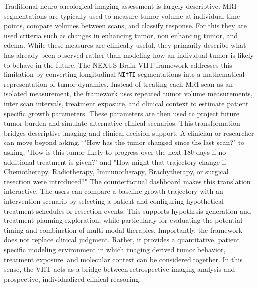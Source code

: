 Traditional neuro oncological imaging assessment is largely descriptive. MRI segmentations are typically used to measure tumor volume at individual time points, compare volumes between scans, and classify response. For this they are used criteria such as changes in enhancing tumor, non enhancing tumor, and edema. While these measures are clinically useful, they primarily describe what has already been observed rather than modeling how an individual tumor is likely to behave in the future. The NEXUS Brain VHT framework addresses this limitation by converting longitudinal \texttt{NIfTI} segmentations into a mathematical representation of tumor dynamics. Instead of treating each MRI scan as an isolated measurement, the framework uses repeated tumor volume measurements, inter scan intervals, treatment exposure, and clinical context to estimate patient specific growth parameters. These parameters are then used to project future tumor burden and simulate alternative clinical scenarios. This transformation bridges descriptive imaging and clinical decision support. A clinician or researcher can move beyond asking, `"How has the tumor changed since the last scan?" to asking, "How is this tumor likely to progress over the next 180 days if no additional treatment is given?" and "How might that trajectory change if Chemotherapy, Radiotherapy, Immunotherapy, Brachytherapy, or surgical resection were introduced?" The counterfactual dashboard makes this translation interactive. The users can compare a baseline growth trajectory with an intervention scenario by selecting a patient and configuring hypothetical treatment schedules or resection events. This supports hypothesis generation and treatment planning exploration, while particularly for evaluating the potential timing and combination of multi modal therapies. Importantly, the framework does not replace clinical judgment. Rather, it provides a quantitative, patient specific modeling environment in which imaging derived tumor behavior, treatment exposure, and molecular context can be considered together. In this sense, the VHT acts as a bridge between retrospective imaging analysis and prospective, individualized clinical reasoning.


